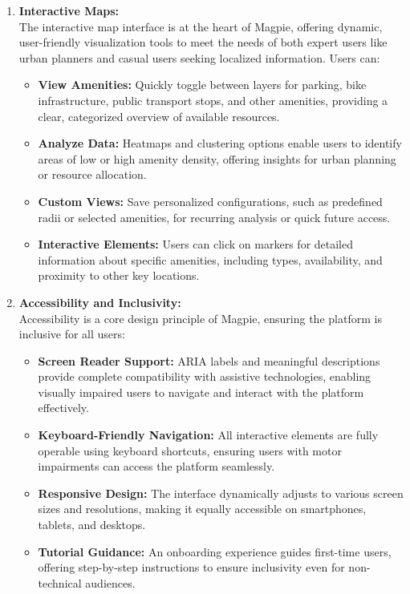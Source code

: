 \begin{enumerate}
\begin{enumerate}
        \item \textbf{Interactive Maps:}\\
        The interactive map interface is at the heart of Magpie, offering dynamic, user-friendly visualization tools to meet the needs of both expert users like urban planners and casual users seeking localized information. Users can:
        \begin{itemize}
            \item \textbf{View Amenities:} Quickly toggle between layers for parking, bike infrastructure, public transport stops, and other amenities, providing a clear, categorized overview of available resources.
            \item \textbf{Analyze Data:} Heatmaps and clustering options enable users to identify areas of low or high amenity density, offering insights for urban planning or resource allocation.
            \item \textbf{Custom Views:} Save personalized configurations, such as predefined radii or selected amenities, for recurring analysis or quick future access.
            \item \textbf{Interactive Elements:} Users can click on markers for detailed information about specific amenities, including types, availability, and proximity to other key locations.
        \end{itemize}
        \item \textbf{Accessibility and Inclusivity:}\\
        Accessibility is a core design principle of Magpie, ensuring the platform is inclusive for all users:
        \begin{itemize}
            \item \textbf{Screen Reader Support:} ARIA labels and meaningful descriptions provide complete compatibility with assistive technologies, enabling visually impaired users to navigate and interact with the platform effectively.
            \item \textbf{Keyboard-Friendly Navigation:} All interactive elements are fully operable using keyboard shortcuts, ensuring users with motor impairments can access the platform seamlessly.
            \item \textbf{Responsive Design:} The interface dynamically adjusts to various screen sizes and resolutions, making it equally accessible on smartphones, tablets, and desktops.
            \item \textbf{Tutorial Guidance:} An onboarding experience guides first-time users, offering step-by-step instructions to ensure inclusivity even for non-technical audiences.

\end{itemize}
\end{enumerate}
\end{enumerate}
